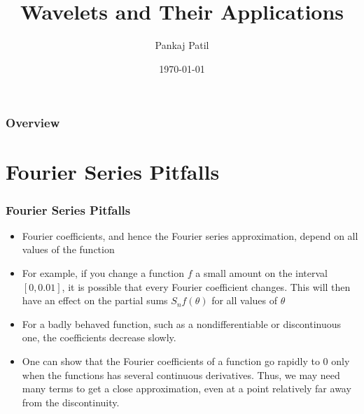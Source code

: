 \documentclass{beamer}
\title[Wavelets Applications]{Wavelets and Their Applications} %
\author{Pankaj Patil} %
\institute[UOFT] %
{
University of Toronto \\ %
\medskip
\textit{pankaj.patil@mail.utoronto.ca} %
}
\date{\today} %
\begin{document}
\begin{frame}
\titlepage %
\end{frame}

\begin{frame}
\frametitle{Overview} %
\tableofcontents %
\end{frame}


\section{Fourier Series Pitfalls} %

\begin{frame}
\frametitle{Fourier Series Pitfalls}

\begin{itemize}
    \item Fourier coefficients, and hence the Fourier series approximation, depend on all values of the function
    \item For example, if you change a function $f$ a small amount on the interval $[0, 0.01]$, it is possible that every Fourier coefficient changes. This will then have an effect on the partial sums $S_n f (\theta )$ for all values of $\theta$
    \item For a badly behaved function, such as a nondifferentiable or discontinuous one, the coefficients decrease slowly.
    \item One can show that the Fourier coefficients of a function go rapidly to 0 only when the functions has several continuous derivatives. Thus, we may need many terms to get a close approximation, even at a point relatively far away from the discontinuity.
\end{itemize}

\end{frame}
\end{document}
